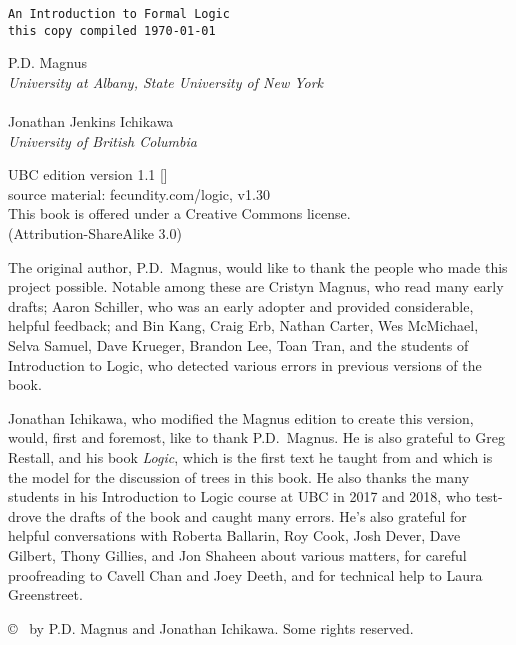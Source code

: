 \thispagestyle{empty}
{\Huge\forallx}

{\tt An Introduction to Formal Logic\\
this copy compiled \today}
\vfill


{\sf P.D. Magnus}\\
\emph{University at Albany, State University of New York}\\
\\
{\sf Jonathan Jenkins Ichikawa}\\
\emph{University of British Columbia}



\vfill




{\sf
	UBC edition version 1.1 [\bookversion]\\
	source material: fecundity.com/logic, v1.30\\
	This book is offered under a Creative Commons license.\\
	(Attribution-ShareAlike 3.0)
}



\newpage
\thispagestyle{empty}%
{\sf
The original author, P.D.\ Magnus, would like to thank the people who made this project possible. Notable among these are Cristyn Magnus, who read many early drafts; Aaron Schiller, who was an early adopter and provided considerable, helpful feedback; {and} Bin Kang, Craig Erb, Nathan Carter, Wes McMichael, Selva Samuel,  Dave Krueger, Brandon Lee, Toan Tran, and the students of Introduction to Logic, who detected various errors in previous versions of the book.

Jonathan Ichikawa, who modified the Magnus edition to create this version, would, first and foremost, like to thank P.D.\ Magnus. He is also grateful to Greg Restall, and his book \emph{Logic}, which is the first text he taught from and which is the model for the discussion of trees in this book. He also thanks the many students in his Introduction to Logic course at UBC in 2017 and 2018, who test-drove the drafts of the book and caught many errors. He's also grateful for helpful conversations with Roberta Ballarin, Roy Cook, Josh Dever, Dave Gilbert, Thony Gillies, and Jon Shaheen about various matters, for careful proofreading to Cavell Chan and Joey Deeth, and for technical help to Laura Greenstreet.

}

\vfill
{
\copyright\  by P.D. Magnus and Jonathan Ichikawa. Some rights reserved.
}

